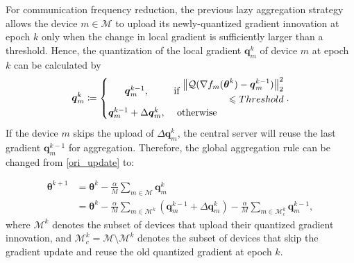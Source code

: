 \documentclass[lettersize,journal]{IEEEtran}
\begin{document}
For communication frequency reduction, the previous lazy aggregation strategy allows the device $m \in \mathcal{M}$ to upload its newly-quantized gradient innovation at epoch $k$ only when the change in local gradient is sufficiently larger than a threshold. Hence, the quantization of the local gradient $\boldsymbol{q}_{m}^{k}$ of device $m$ at epoch $k$ can be calculated by
\begin{equation}
\boldsymbol{q}_{m}^{k} \coloneqq 
\begin{cases}
\hfil \boldsymbol{q}_{m}^{k-1} , & \text {if } 
\begin{split}
\big\|\mathcal{Q}(\nabla f_m(\boldsymbol{\theta}^{k})-\boldsymbol{q}_{m}^{k-1})\big\|_2^2 \\
\leqslant  Threshold
\end{split}
\\ 
\hfil \boldsymbol{q}_{m}^{k-1} + \Delta \boldsymbol{q}_{m}^{k},
 & \text { otherwise }
 \end{cases}.
\label{lazy_aggre_laq}
\end{equation}
If the device $m$ skips the upload of $\Delta \boldsymbol{q}_{m}^{k}$, the central server will reuse the last gradient $\boldsymbol{q}_{m}^{k-1}$ for aggregation. Therefore, the global aggregation rule can be changed from \eqref{ori_update} to:

\begin{align}
\label{lazy_aggre}
\boldsymbol{\theta} ^{k+1} &= \boldsymbol{\theta} ^{k} - \frac{\alpha}{M}\sum_{m \in \mathcal{M}}\boldsymbol{q}_{m}^{k} \\
&=\boldsymbol{\theta} ^{k}-\frac{\alpha}{M}\sum_{m \in \mathcal{M}^k}\left(\boldsymbol{q}_{m}^{k-1} + \Delta \boldsymbol{q}_{m}^{k}\right)- 
\frac{\alpha}{M} \sum_{m \in \mathcal{M}_{c}^{k}}\boldsymbol{q}_{m}^{k-1},\nonumber
\end{align}
where $\mathcal{M}^{k}$ denotes the subset of devices that upload their quantized gradient innovation, and $\mathcal{M}_c^k = \mathcal{M}\setminus \mathcal{M}^{k}$ denotes the subset of devices that skip the gradient update and reuse the old quantized gradient at epoch $k$. 
\end{document}
